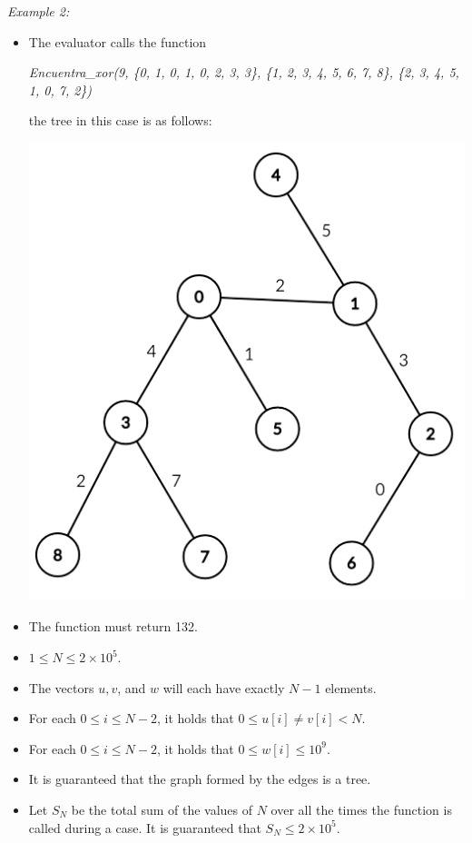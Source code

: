 \documentclass[12pt]{scrartcl}
\begin{document}
        {\itshape Example 2:}
        \begin{itemize}
            \item The evaluator calls the function 
            \begin{center}
                \textit{Encuentra\_xor(9, \{0, 1, 0, 1, 0, 2, 3, 3\}, \{1, 2, 3, 4, 5, 6, 7, 8\}, \{2, 3, 4, 5, 1, 0, 7, 2\})} 
            \end{center}
            the tree in this case is as follows:

            \begin{center}
                \includegraphics[scale=0.5]{ej2.png}
            \end{center}
            \item The function must return 132.
            
        \end{itemize}
               
        


    
        \begin{itemize}
            \item $1 \le N \le 2\times10^5$.
            \item The vectors $u, v$, and $w$ will each have exactly $N - 1$ elements.
            \item For each $0 \le i \le N - 2$, it holds that $0 \le u[i] \neq v[i] < N$. 
            \item For each $0 \le i \le N - 2$, it holds that $0 \le w[i] \le 10^9$.
            \item It is guaranteed that the graph formed by the edges is a tree.
            \item Let $S_N$ be the total sum of the values of $N$ over all the times the function is called during a case. It is guaranteed that $S_N \le 2 \times 10^5$.
        \end{itemize}
    
\end{document}
